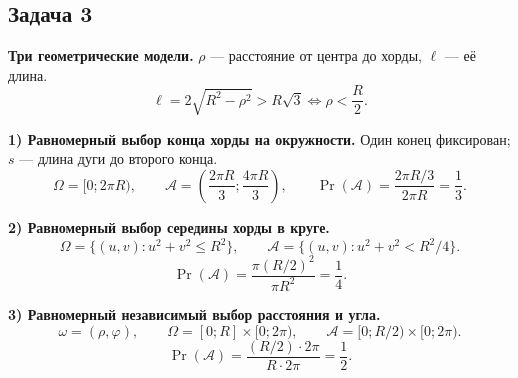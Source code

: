 \clearpage
\subsection{Задача 3}

\begin{solution}
    \textbf{Три геометрические модели.}
    $\rho$ --- расстояние от центра до хорды, $\ell$ --- её длина.
    \[
        \ell=2\sqrt{R^2-\rho^2}>R\sqrt3
        \iff \rho<\frac R2.
    \]

    \textbf{1) Равномерный выбор конца хорды на окружности.}
    Один конец фиксирован; $s$ --- длина дуги до второго конца.
    \[
        \Omega=[0;2\pi R),\qquad
        \mathcal{A}=\left(\frac{2\pi R}{3};\frac{4\pi R}{3}\right),
        \qquad \Pr(\mathcal{A})=\frac{2\pi R/3}{2\pi R}
        =\boxed{\frac13}.
    \]

    \textbf{2) Равномерный выбор середины хорды в круге.}
    \[
        \Omega=\{(u,v):u^2+v^2\leq R^2\},\qquad
        \mathcal{A}=\{(u,v):u^2+v^2<R^2/4\}.
    \]
    \[
        \Pr(\mathcal{A})=\frac{\pi(R/2)^2}{\pi R^2}
        =\boxed{\frac14}.
    \]

    \textbf{3) Равномерный независимый выбор расстояния и угла.}
    \[
        \omega=(\rho,\varphi),\qquad
        \Omega=[0;R]\times[0;2\pi),\qquad
        \mathcal{A}=[0;R/2)\times[0;2\pi).
    \]
    \[
        \Pr(\mathcal{A})=\frac{(R/2)\cdot2\pi}{R\cdot2\pi}
        =\boxed{\frac12}.
    \]


\end{solution}
